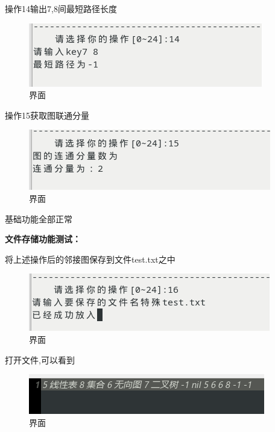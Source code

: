\documentclass[supercite]{Experimental_Report}
\theoremstyle{definition}
\begin{document}
操作14输出7,8间最短路径长度

\begin{figure}[!htb]
	\begin{center}
		\includegraphics[scale=0.60]{images/2-24.png}
		\caption{界面}
		\label{fig2-24}
		\end{center}
\end{figure}

操作15获取图联通分量

\begin{figure}[!htb]
	\begin{center}
		\includegraphics[scale=0.60]{images/2-25.png}
		\caption{界面}
		\label{fig2-25}
		\end{center}
\end{figure}

基础功能全部正常

\textbf{文件存储功能测试：}

将上述操作后的邻接图保存到文件test.txt之中

\begin{figure}[!htb]
	\begin{center}
		\includegraphics[scale=0.60]{images/2-26.png}
		\caption{界面}
		\label{fig2-26}
		\end{center}
\end{figure}

打开文件,可以看到

\begin{figure}[!htb]
	\begin{center}
		\includegraphics[scale=0.60]{images/2-27.png}
		\caption{界面}
		\label{fig2-27}
		\end{center}
\end{figure}
\end{document}
